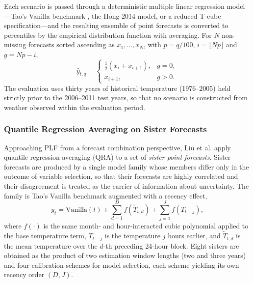\documentclass[10pt,journal,compsoc]{IEEEtran}
\begin{document}
Each scenario is passed through a deterministic multiple linear regression model---Tao's
Vanilla benchmark \cite{hong2010short}, the Hong-2014 model, or a reduced T-cube
specification---and the resulting ensemble of point forecasts is converted to percentiles by
the empirical distribution function with averaging. For $N$ non-missing forecasts sorted
ascending as $x_1,\dots,x_N$, with $p = q/100$, $i = \lfloor Np \rfloor$ and $g = Np - i$,
\begin{equation}
\hat{y}_{t,q} =
\begin{cases}
\tfrac{1}{2}\left(x_i + x_{i+1}\right), & g = 0,\\[2pt]
x_{i+1}, & g > 0 .
\end{cases}
\end{equation}
The evaluation uses thirty years of historical temperature (1976--2005) held strictly prior
to the 2006--2011 test years, so that no scenario is constructed from weather observed within
the evaluation period.

\subsubsection{Quantile Regression Averaging on Sister Forecasts}
Approaching PLF from a forecast combination perspective, Liu et al.
\cite{liu2017probabilistic} apply quantile regression averaging (QRA) to a set of
\emph{sister point forecasts}. Sister forecasts are produced by a single model family whose
members differ only in the outcome of variable selection, so that their forecasts are highly
correlated and their disagreement is treated as the carrier of information about uncertainty.
The family is Tao's Vanilla benchmark augmented with a recency effect,
\begin{equation}
y_t = \text{Vanilla}(t) + \sum_{d=1}^{D} f\!\left(\tilde{T}_{t,d}\right)
                        + \sum_{j=1}^{J} f\!\left(T_{t-j}\right),
\end{equation}
where $f(\cdot)$ is the same month- and hour-interacted cubic polynomial applied to the base
temperature term, $T_{t-j}$ is the temperature $j$ hours earlier, and $\tilde{T}_{t,d}$ is the
mean temperature over the $d$-th preceding 24-hour block. Eight sisters are obtained as the
product of two estimation window lengths (two and three years) and four calibration schemes
for model selection, each scheme yielding its own recency order $(D,J)$.
\end{document}
